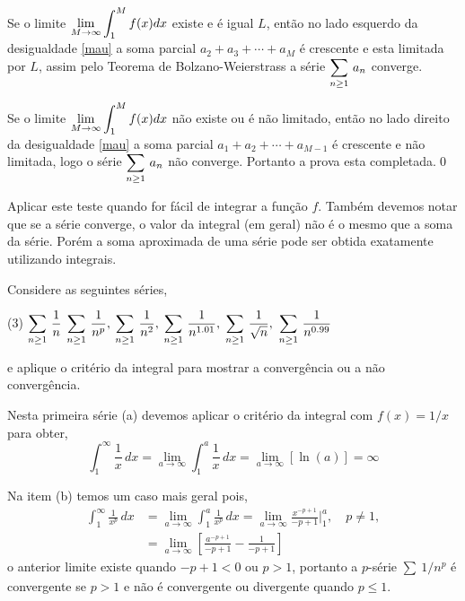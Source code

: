 Se o limite $\displaystyle{\lim_{M\to \infty}\int_1^Mf(x)dx}$ existe e \'{e}
igual $L$, ent\~{a}o no lado esquerdo  da desigualdade \eqref{mau} a
soma parcial $a_2+a_3+\cdots+a_{M}$ \'{e} crescente e esta limitada
por $L$, assim pelo Teorema de Bolzano-Weierstrass  a s\'{e}rie
$\displaystyle{\sum_{n\geq1}\,a_n}$ converge.

Se o limite $\displaystyle{\lim_{M\to \infty}\int_1^Mf(x)dx}$ n\~{a}o existe ou
\'{e} n\~{a}o limitado, ent\~{a}o no lado direito  da desigualdade \eqref{mau}
a soma parcial $a_1+a_2+\cdots+a_{M-1}$ \'{e} crescente e n\~{a}o
limitada, logo o s\'{e}rie $\displaystyle{\sum_{n\geq1}\,a_n}$ n\~{a}o converge.
Portanto a prova esta completada.\qed

\begin{obs}
Aplicar este teste quando for f\'{a}cil de integrar a fun\c{c}\~{a}o $f$.
Tamb\'{e}m devemos notar que se a s\'{e}rie converge, o valor da integral
(em geral) n\~{a}o \'{e} o mesmo que a soma da s\'{e}rie. Por\'{e}m a soma
aproximada de uma s\'{e}rie pode ser obtida exatamente utilizando
integrais.
\end{obs}

\begin{exer}
Considere as seguintes s\'{e}ries,
\begin{tasks}[label=(\alph*),item-indent=6em,label-width=4ex,ref=(\alph*)](3)
\task  \(\displaystyle\sum_{n\geq 1}\,\frac{1}{n}\)
\task  \(\displaystyle\sum_{n\geq1}\,\frac{1}{n^p},\)
\task  \(\displaystyle \sum_{n\geq1}\,\frac{1}{n^2},\)
\task  \(\displaystyle \sum_{n\geq1}\,\frac{1}{n^{1.01}},\)
\task \(\displaystyle \sum_{n\geq1}\,\frac{1}{\sqrt{n}},\)
\task \(\displaystyle \sum_{n\geq1}\,\frac{1}{n^{0.99}}\)
\end{tasks}
e aplique o crit\'{e}rio da integral para mostrar a converg\^{e}ncia ou a n\~{a}o converg\^{e}ncia.
\end{exer}

\solo Nesta primeira s\'{e}rie (a) devemos aplicar o crit\'{e}rio da integral
com $f(x)=1/x$ para obter,
\begin{equation*}
  \int_1^{\infty}\frac{1}{x}\,dx=\lim_{a\to\infty}
  \int_1^{a}\frac{1}{x}\,dx=\lim_{a\to\infty}[\ln(a )]=\infty
\end{equation*}

Na item (b) temos um caso mais geral pois,
\begin{align*}
  \int_1^{\infty}\frac{1}{x^p}\,dx&=\lim_{a\to\infty}\int_1^{a}\frac{1}{x^p}\,dx=
  \lim_{a\to\infty}\frac{x^{-p+1}}{-p+1}\Bigg|_1^a,\quad p\neq 1,\\[2ex]
  &=\lim_{a\to\infty}\left[\frac{a^{-p+1}}{-p+1}-\frac{1}{-p+1}\right]
\end{align*}
o anterior limite existe quando $-p+1<0$ ou $p>1$, portanto a
$p$-s\'{e}rie $\sum_{}\,{1}/{n^{p}}$ \'{e} convergente se
$p>1$ e n\~{a}o \'{e} convergente ou divergente quando $p\leq 1$.

